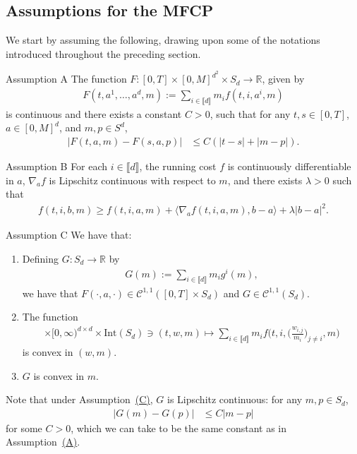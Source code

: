 \documentclass[11pt,reqno]{amsart}
\numberwithin{equation}{section}
\theoremstyle{plain}
\newcommand{\thistheoremname}{}
\newtheorem*{genericthm*}{\thistheoremname}
\newenvironment{assumption*}[1]
  {\renewcommand{\thistheoremname}{#1}
   \begin{genericthm*}}
  {\end{genericthm*}}
\newcommand{\R}{\mathbb{R}}
\newcommand{\sC}{\mathcal{C}}
\newcommand{\lbrs}[1]{\llbracket #1 \rrbracket}
\newcommand{\intr}{\text{Int}}
\begin{document}
\subsection{Assumptions for the MFCP}
\label{subsec:assumptions}
We start by assuming the following, drawing upon some of the notations introduced throughout the preceding section.
\begin{assumption*}{Assumption A}
\label{a:mfcp-A}
The function $F : [0, T] \times [0, M]^{d^2} \times S_d \to \R$, given by
\begin{align*}
    F(t, a^1, \ldots, a^d, m) := \sum_{i \in \lbrs{d}} m_i f(t, i, a^i, m)
\end{align*}
is continuous and there exists a constant $C>0$, such that for any $t,s\in[0,T]$, $a\in[0,M]^d$, and $m,p\in S^d$,
\begin{align*}
    |F(t,a,m) - F(s,a,p)| &\leq  C(|t-s| + |m-p|).
\end{align*}
\end{assumption*}
\begin{assumption*}{Assumption B}
\label{a:mfcp-B}
For each $i \in \lbrs{d}$, the running cost $f$ is continuously differentiable in $a$, $\nabla_a f$ is Lipschitz continuous with respect to $m$, and there exists $\lambda > 0$ such that
\begin{align*}
    f(t, i, b,m) \geq f(t, i, a,m) + \langle \nabla_a f(t, i, a, m), b-a \rangle + \lambda |b-a|^2.
\end{align*}
\end{assumption*}
\begin{assumption*}{Assumption C}
\label{a:mfcp-C}
We have that:
\begin{enumerate}
\item[(C1)] Defining $G : S_d \to \R$ by
\begin{align*}
    G(m) := \sum_{i \in \lbrs{d}} m_i g^i(m),
\end{align*}
we have that
$F(\cdot, a, \cdot) \in \sC^{1,1}([0, T] \times S_d)$ and $G \in \sC^{1,1}(S_d)$.
\item[(C2)] The function
\begin{align*}
    [0,T] \times [0, \infty)^{d \times d} \times \intr(S_d) \ni (t,w,m) \mapsto \sum_{i \in \lbrs{d}}m_i f\Big(t, i, \Big(\frac{w_{i,j}}{m_i}\Big)_{j\neq i}, m\Big)
\end{align*}
is convex in $(w, m)$.
\item[(C3)] $G$ is convex in $m$.
\end{enumerate}
\end{assumption*}
Note that under Assumption~\hyperref[a:mfcp-C]{(C)}, $G$ is Lipschitz continuous: for any $m, p \in S_d$,
\begin{align*}
    |G(m) - G(p)| &\leq C|m-p|
\end{align*}
for some $C > 0$, which we can take to be the same constant as in Assumption~\hyperref[a:mfcp-A]{(A)}.
\end{document}
